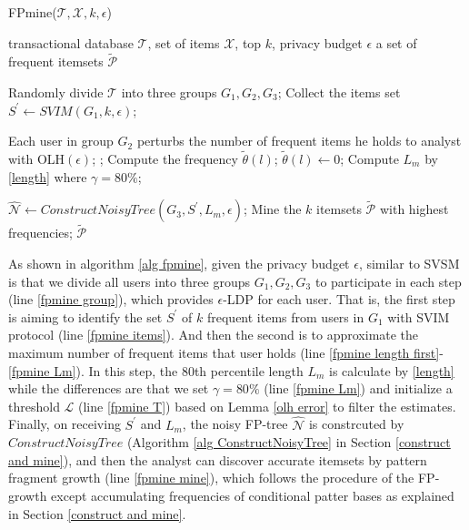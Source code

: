 \documentclass[conference]{IEEEtran}
\begin{document}
\begin{algorithm}[htbp]
  \caption{FPmine($\mathcal{T},\mathcal{X},k,\epsilon$)}
  \label{alg fpmine}
  \begin{algorithmic}[1]
  \REQUIRE transactional database $\mathcal{T}$, set of items $\mathcal{X}$, top $k$, privacy budget $\epsilon$
  \ENSURE a set of frequent itemsets $\tilde{\mathcal{P}}$

  \STATE Randomly divide $\mathcal{T}$ into three groups $G_1,G_2,G_3$; \label{fpmine group}
  \STATE Collect the items set $S^{\prime} \gets SVIM(G_1,k,\epsilon)$; \label{fpmine items}
  
  \STATE Each user in group $G_2$ perturbs the number of frequent items he holds to analyst with OLH$({\epsilon})$;\label{fpmine length first}
  ;\label{fpmine T}
    \STATE Compute the frequency $\tilde{\theta}(l)$;
      \STATE $\tilde{\theta}(l) \gets 0$;
    \ENDIF
  \ENDFOR
  \STATE Compute $L_{m}$ by \eqref{length} where $\gamma=80\%$;\label{fpmine Lm}

  \STATE $\hat{\mathcal{N}} \gets ConstructNoisyTree(G_3,S^{\prime},L_m,\epsilon)$;
  \STATE Mine the $k$ itemsets $\tilde{\mathcal{P}}$ with highest frequencies; \label{fpmine mine}
  \RETURN $\tilde{\mathcal{P}}$
  \end{algorithmic}
\end{algorithm}

As shown in algorithm \ref{alg fpmine}, given the privacy budget $\epsilon$, similar to SVSM is that we divide all users into three groups $G_1,G_2,G_3$ to participate in each step (line \ref{fpmine group}), which provides $\epsilon$-LDP for each user. That is, the first step is aiming to identify the set $S^{\prime}$ of $k$ frequent items from users in $G_1$ with SVIM protocol (line \ref{fpmine items}). And then the second is to approximate the maximum number of frequent items that user holds (line \ref{fpmine length first}-\ref{fpmine Lm}). In this step, the 80th percentile length $L_m$ is calculate by \eqref{length} while the differences are that we set $\gamma=80\%$ (line \ref{fpmine Lm}) and initialize a threshold {\color{red}$\mathcal{L}$} (line \ref{fpmine T}) based on Lemma \ref{olh error} to filter the estimates. Finally, on receiving $S^{\prime}$ and $L_m$, the noisy FP-tree {\color{red}$\hat{\mathcal{N}}$} is constrcuted by $ConstructNoisyTree$ (Algorithm \ref{alg ConstructNoisyTree} in Section \ref{construct and mine}), and then the analyst can discover accurate itemsets by pattern fragment growth (line \ref{fpmine mine}), which follows the procedure of the FP-growth except accumulating frequencies of conditional patter bases as explained in Section \ref{construct and mine}. 
\end{document}
